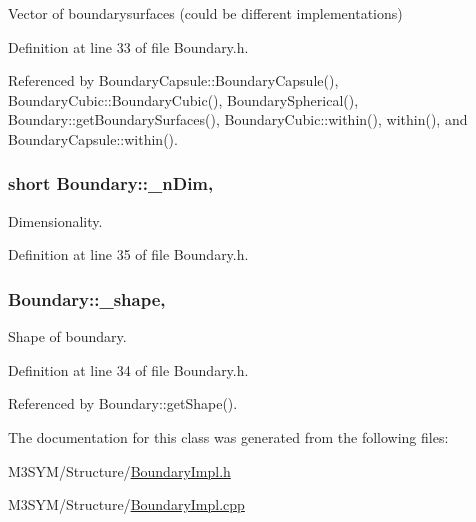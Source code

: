 Vector of boundarysurfaces (could be different implementations) 



Definition at line 33 of file Boundary.\+h.



Referenced by Boundary\+Capsule\+::\+Boundary\+Capsule(), Boundary\+Cubic\+::\+Boundary\+Cubic(), Boundary\+Spherical(), Boundary\+::get\+Boundary\+Surfaces(), Boundary\+Cubic\+::within(), within(), and Boundary\+Capsule\+::within().

\hypertarget{classBoundary_a96f2294e0c822ab216fe5ab7e17258c7}{
\subsubsection[{\+\_\+n\+Dim}]{\setlength{\rightskip}{0pt plus 5cm}short Boundary\+::\+\_\+n\+Dim\hspace{0.3cm}{\ttfamily [protected]}, {\ttfamily [inherited]}}}\label{classBoundary_a96f2294e0c822ab216fe5ab7e17258c7}


Dimensionality. 



Definition at line 35 of file Boundary.\+h.

\hypertarget{classBoundary_a04c10c9a7aea1924d779d392e29f94ff}{
\subsubsection[{\+\_\+shape}]{ Boundary\+::\+\_\+shape\hspace{0.3cm}{\ttfamily [protected]}, {\ttfamily [inherited]}}}\label{classBoundary_a04c10c9a7aea1924d779d392e29f94ff}


Shape of boundary. 



Definition at line 34 of file Boundary.\+h.



Referenced by Boundary\+::get\+Shape().



The documentation for this class was generated from the following files\+:\begin{DoxyCompactItemize}
\item 
M3\+S\+Y\+M/\+Structure/\hyperlink{BoundaryImpl_8h}{Boundary\+Impl.\+h}\item 
M3\+S\+Y\+M/\+Structure/\hyperlink{BoundaryImpl_8cpp}{Boundary\+Impl.\+cpp}\end{DoxyCompactItemize}
